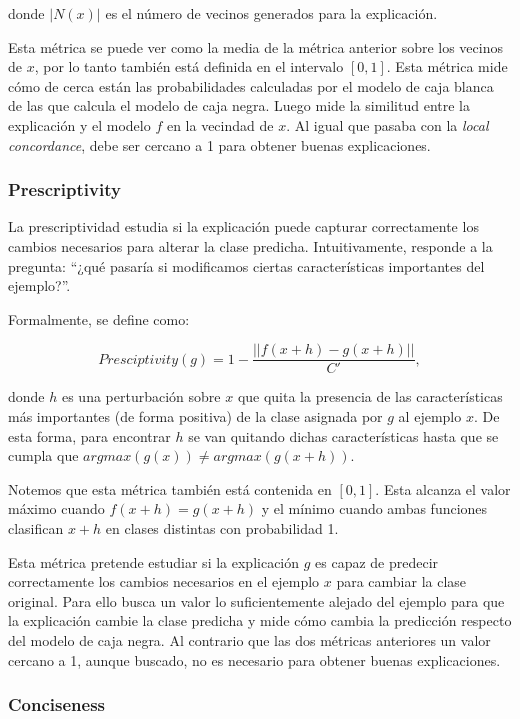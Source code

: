 donde $|N(x)|$ es el número de vecinos generados para la explicación. 

Esta métrica se puede ver como la media de la métrica anterior sobre los vecinos de $x$, por lo tanto también está definida en el intervalo $[0,1]$. Esta métrica mide cómo de cerca están las probabilidades calculadas por el modelo de caja blanca de las que calcula el modelo de caja negra. Luego mide la similitud entre la explicación y el modelo $f$ en la vecindad de $x$. Al igual que pasaba con la \textit{local concordance}, debe ser cercano a 1 para obtener buenas explicaciones.

\subsubsection{Prescriptivity}

La prescriptividad estudia si la explicación puede capturar correctamente los cambios necesarios para alterar la clase predicha. Intuitivamente, responde a la pregunta: “¿qué pasaría si modificamos ciertas características importantes del ejemplo?”.

Formalmente, se define como:

\begin{equation}
Presciptivity(g) =  1 - \frac{||f(x+h)-g(x+h)||}{C'},
\end{equation}

donde $h$ es una perturbación sobre $x$ que quita la presencia de las características más importantes (de forma positiva) de la clase asignada por $g$ al ejemplo $x$. De esta forma, para encontrar $h$ se van quitando dichas características hasta que se cumpla que $argmax(g(x))\neq argmax(g(x+h))$.

Notemos que esta métrica también está contenida en $[0,1]$. Esta alcanza el valor máximo cuando $f(x+h)=g(x+h)$ y el mínimo cuando ambas funciones clasifican $x+h$ en clases distintas con probabilidad 1.

Esta métrica pretende estudiar si la explicación $g$ es capaz de predecir correctamente los cambios necesarios en el ejemplo $x$ para cambiar la clase original. Para ello busca un valor lo suficientemente alejado del ejemplo para que la explicación cambie la clase predicha y mide cómo cambia la predicción respecto del modelo de caja negra. Al contrario que las dos métricas anteriores un valor cercano a 1, aunque buscado, no es necesario para obtener buenas explicaciones.

\subsubsection{Conciseness}

